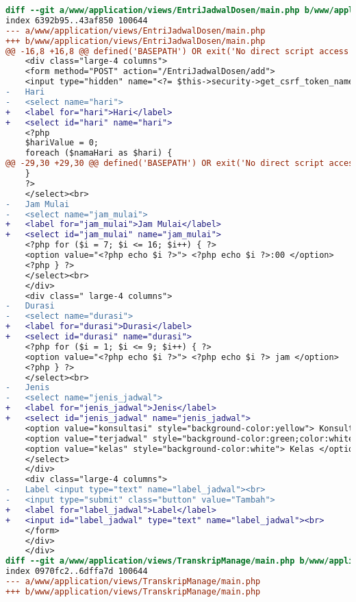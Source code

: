 \begin{lstlisting}[frame=single, label={lst:perbaikan_2.5.3_label_dan_nama_pada_komponen_masukan}, language=diff, caption=Perbaikan Kriteria Sukses 2.5.3 - Label dan Nama Pada Komponen Masukan]
diff --git a/www/application/views/EntriJadwalDosen/main.php b/www/application/views/EntriJadwalDosen/main.php
index 6392b95..43af850 100644
--- a/www/application/views/EntriJadwalDosen/main.php
+++ b/www/application/views/EntriJadwalDosen/main.php
@@ -16,8 +16,8 @@ defined('BASEPATH') OR exit('No direct script access allowed');
    <div class="large-4 columns">
    <form method="POST" action="/EntriJadwalDosen/add">
    <input type="hidden" name="<?= $this->security->get_csrf_token_name() ?>" value="<?= $this->security->get_csrf_hash() ?>" />
-   Hari
-   <select name="hari"> 
+   <label for="hari">Hari</label>
+   <select id="hari" name="hari"> 
    <?php
    $hariValue = 0;
    foreach ($namaHari as $hari) {
@@ -29,30 +29,30 @@ defined('BASEPATH') OR exit('No direct script access allowed');
    }
    ?>
    </select><br>
-   Jam Mulai
-   <select name="jam_mulai"> 
+   <label for="jam_mulai">Jam Mulai</label>
+   <select id="jam_mulai" name="jam_mulai">  
    <?php for ($i = 7; $i <= 16; $i++) { ?>
    <option value="<?php echo $i ?>"> <?php echo $i ?>:00 </option>
    <?php } ?>
    </select><br>
    </div>
    <div class=" large-4 columns">
-   Durasi
-   <select name="durasi"> 
+   <label for="durasi">Durasi</label>
+   <select id="durasi" name="durasi">  
    <?php for ($i = 1; $i <= 9; $i++) { ?>
    <option value="<?php echo $i ?>"> <?php echo $i ?> jam </option>
    <?php } ?>
    </select><br>
-   Jenis  
-   <select name="jenis_jadwal"> 
+   <label for="jenis_jadwal">Jenis</label>
+   <select id="jenis_jadwal" name="jenis_jadwal">  
    <option value="konsultasi" style="background-color:yellow"> Konsultasi </option>
    <option value="terjadwal" style="background-color:green;color:white"> Terjadwal</option>
    <option value="kelas" style="background-color:white"> Kelas </option>
    </select>
    </div>
    <div class="large-4 columns">
-   Label <input type="text" name="label_jadwal"><br>
-   <input type="submit" class="button" value="Tambah">
+   <label for="label_jadwal">Label</label>
+   <input id="label_jadwal" type="text" name="label_jadwal"><br>
    </form>
    </div>
    </div>
diff --git a/www/application/views/TranskripManage/main.php b/www/application/views/TranskripManage/main.php
index 0970fc2..6dffa7d 100644
--- a/www/application/views/TranskripManage/main.php
+++ b/www/application/views/TranskripManage/main.php

\end{lstlisting}
